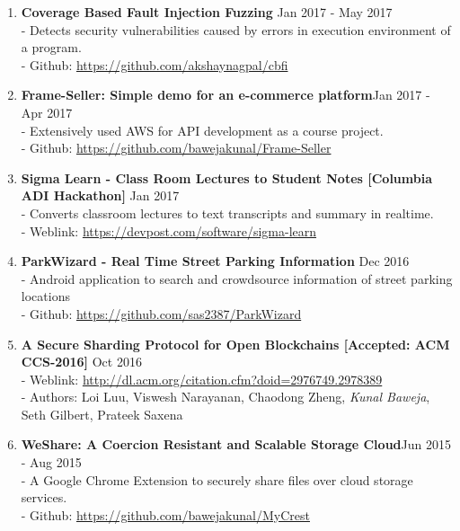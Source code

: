 \documentclass{article}
\begin{document}
\begin{enumerate}

    \item \textbf{Coverage Based Fault Injection Fuzzing} {\hfill Jan 2017 - May 2017}\\
    - Detects security vulnerabilities caused by errors in execution environment of a program.\\
    - Github: \href{https://github.com/akshaynagpal/cbfi}{https://github.com/akshaynagpal/cbfi}

    \item \textbf{Frame-Seller: Simple demo for an e-commerce platform}{\hfill Jan 2017 - Apr 2017}\\
    - Extensively used AWS for API development as a course project.\\
    - Github: \href{https://github.com/bawejakunal/Frame-Seller}{https://github.com/bawejakunal/Frame-Seller}

    \item \textbf{Sigma Learn - Class Room Lectures to Student Notes [Columbia ADI Hackathon]} {\hfill Jan 2017}\\
    - Converts classroom lectures to text transcripts and summary in realtime.\\
    - Weblink: \href{https://devpost.com/software/sigma-learn}{https://devpost.com/software/sigma-learn}

    \item \textbf{ParkWizard - Real Time Street Parking Information} {\hfill Dec 2016}\\
    - Android application to search and crowdsource information of street parking locations\\
    - Github: \href{https://github.com/sas2387/ParkWizard}{https://github.com/sas2387/ParkWizard}

    \item \textbf{A Secure Sharding Protocol for Open Blockchains [Accepted: ACM CCS-2016]} {\hfill Oct 2016}\\
    - Weblink: \href{http://dl.acm.org/citation.cfm?doid=2976749.2978389}{http://dl.acm.org/citation.cfm?doid=2976749.2978389}\\
    - Authors: Loi Luu, Viswesh Narayanan, Chaodong Zheng, \textit{Kunal Baweja}, Seth Gilbert, Prateek Saxena

    \item \textbf{WeShare: A Coercion Resistant and Scalable Storage Cloud}{\hfill Jun 2015 - Aug 2015}\\
    - A Google Chrome Extension to securely share files over cloud storage services.\\
    - Github: \href{https://github.com/bawejakunal/MyCrest}{https://github.com/bawejakunal/MyCrest}
    

\end{enumerate}
\end{document}
